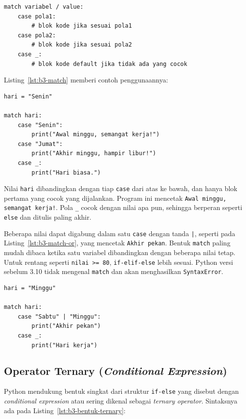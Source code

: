 \begin{lstlisting}[style=PythonStyle, caption={Bentuk dasar match}, label={lst:b3-bentuk-match}]
match variabel / value:
    case pola1:
        # blok kode jika sesuai pola1
    case pola2:
        # blok kode jika sesuai pola2
    case _:
        # blok kode default jika tidak ada yang cocok
\end{lstlisting}

Listing~\ref{lst:b3-match} memberi contoh penggunaannya:

\begin{lstlisting}[style=PythonStyle, caption={Kode Python: match.py}, label={lst:b3-match}]
hari = "Senin"

match hari:
    case "Senin":
        print("Awal minggu, semangat kerja!")
    case "Jumat":
        print("Akhir minggu, hampir libur!")
    case _:
        print("Hari biasa.")
\end{lstlisting}

Nilai \texttt{hari} dibandingkan dengan tiap \texttt{case} dari atas ke bawah, dan hanya blok pertama yang cocok yang dijalankan. Program ini mencetak \texttt{Awal minggu, semangat kerja!}. Pola \texttt{_} cocok dengan nilai apa pun, sehingga berperan seperti \texttt{else} dan ditulis paling akhir.

Beberapa nilai dapat digabung dalam satu \texttt{case} dengan tanda \texttt{|}, seperti pada Listing~\ref{lst:b3-match-or}, yang mencetak \texttt{Akhir pekan}. Bentuk \texttt{match} paling mudah dibaca ketika satu variabel dibandingkan dengan beberapa nilai tetap. Untuk rentang seperti \texttt{nilai >= 80}, \texttt{if-elif-else} lebih sesuai. Python versi sebelum 3.10 tidak mengenal \texttt{match} dan akan menghasilkan \texttt{SyntaxError}.

\begin{lstlisting}[style=PythonStyle, caption={Kode Python: match_beberapa_nilai.py}, label={lst:b3-match-or}]
hari = "Minggu"

match hari:
    case "Sabtu" | "Minggu":
        print("Akhir pekan")
    case _:
        print("Hari kerja")
\end{lstlisting}

\subsection{Operator Ternary (\textit{Conditional Expression})}

Python mendukung bentuk singkat dari struktur \texttt{if-else} yang disebut dengan
\textit{conditional expression} atau sering dikenal sebagai \textit{ternary operator}.
Sintaksnya ada pada Listing~\ref{lst:b3-bentuk-ternary}:

